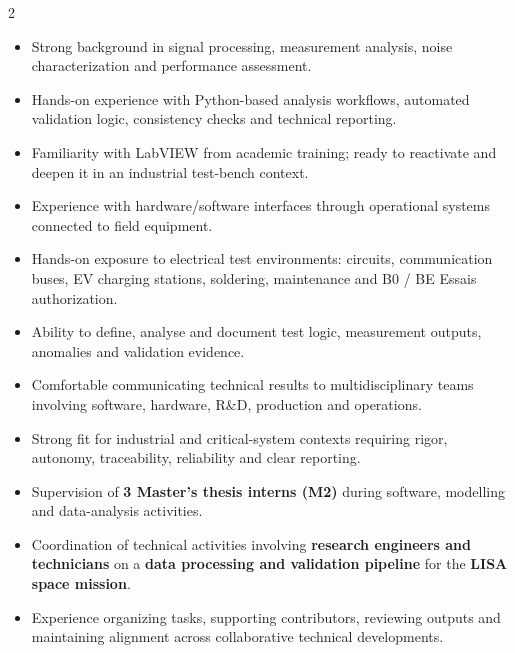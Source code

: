 \documentclass[8pt,a4paper,ragged2e,withhyper]{altacv}
\begin{document}
\begin{paracol}{2}
\begin{itemize}
  \item Strong background in signal processing, measurement analysis, noise characterization and performance assessment.
  \item Hands-on experience with Python-based analysis workflows, automated validation logic, consistency checks and technical reporting.
  \item Familiarity with LabVIEW from academic training; ready to reactivate and deepen it in an industrial test-bench context.
  \item Experience with hardware/software interfaces through operational systems connected to field equipment.
  \item Hands-on exposure to electrical test environments: circuits, communication buses, EV charging stations, soldering, maintenance and B0 / BE Essais authorization.
  \item Ability to define, analyse and document test logic, measurement outputs, anomalies and validation evidence.
  \item Comfortable communicating technical results to multidisciplinary teams involving software, hardware, R\&D, production and operations.
  \item Strong fit for industrial and critical-system contexts requiring rigor, autonomy, traceability, reliability and clear reporting.
\end{itemize}


\begin{itemize}
  \item Supervision of \textbf{3 Master's thesis interns (M2)} during software, modelling and data-analysis activities.
  \item Coordination of technical activities involving \textbf{research engineers and technicians} on a \textbf{data processing and validation pipeline} for the \textbf{LISA space mission}.
  \item Experience organizing tasks, supporting contributors, reviewing outputs and maintaining alignment across collaborative technical developments.
\end{itemize}


\divider
{}
\divider

\medskip



\end{paracol}
\end{document}

